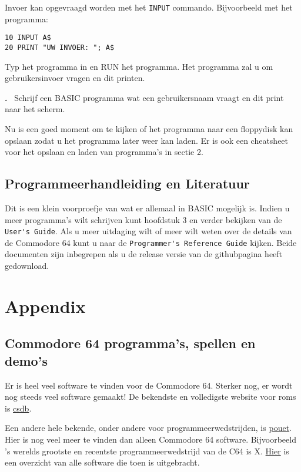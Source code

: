 \documentclass{article}
\newcounter{problem}
\newcounter{solution}
\newcommand\problem{%
  \stepcounter{problem}%
  \textbf{\theproblem.}~%
  \setcounter{solution}{0}%
}
\begin{document}
Invoer kan opgevraagd worden met het \verb:INPUT: commando.
Bijvoorbeeld met het programma:

\begin{lstlisting}
10 INPUT A$
20 PRINT "UW INVOER: "; A$
\end{lstlisting}

Typ het programma in en RUN het programma.
Het programma zal u om gebruikersinvoer vragen en dit printen.

\problem Schrijf een BASIC programma wat een gebruikersnaam vraagt en dit print naar het scherm.

Nu is een goed moment om te kijken of het programma naar een floppydisk kan opslaan zodat u het programma later weer kan laden.
Er is ook een cheatsheet voor het opslaan en laden van programma's in sectie 2.

\subsection{Programmeerhandleiding en Literatuur}

Dit is een klein voorproefje van wat er allemaal in BASIC mogelijk is.
Indien u meer programma's wilt schrijven kunt hoofdstuk 3 en verder bekijken van de \verb:User's Guide:.
Als u meer uitdaging wilt of meer wilt weten over de details van de Commodore 64 kunt u naar de \verb:Programmer's Reference Guide: kijken.
Beide documenten zijn inbegrepen als u de release versie van de githubpagina heeft gedownload.

\section{Appendix}

\subsection{Commodore 64 programma's, spellen en demo's}

Er is heel veel software te vinden voor de Commodore 64.
Sterker nog, er wordt nog steeds veel software gemaakt!
De bekendste en volledigste website voor roms is \href{http://csdb.dk}{csdb}.

Een andere hele bekende, onder andere voor programmeerwedstrijden, is \href{https://www.pouet.net}{pouet}.
Hier is nog veel meer te vinden dan alleen Commodore 64 software.
Bijvoorbeeld 's werelds grootste en recentste programmeerwedstrijd van de C64 is X.
\href{https://www.pouet.net/party.php?which=50&when=2016}{Hier} is een overzicht van alle software die toen is uitgebracht.
\end{document}
